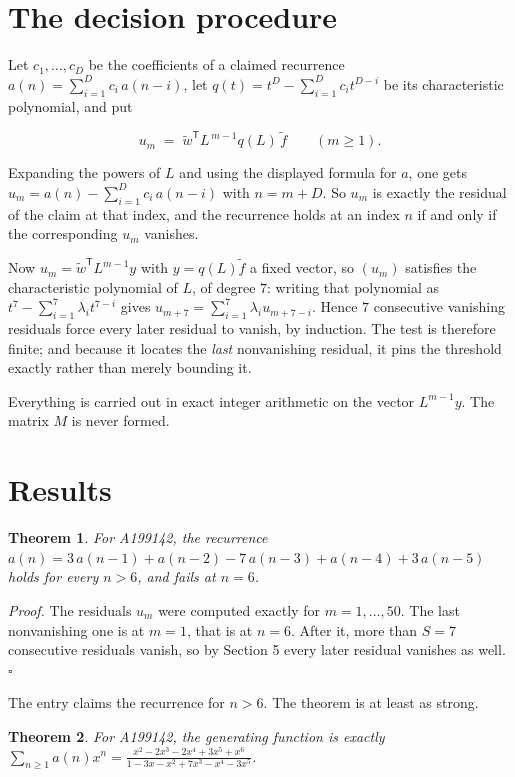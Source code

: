 \documentclass[11pt]{article}
\newtheorem{theorem}{Theorem}
\theoremstyle{definition}
\begin{document}
\section{The decision procedure}

Let $c_1,\dots,c_D$ be the coefficients of a claimed recurrence $a(n) = \sum_{i=1}^{D} c_i\,a(n-i)$, let $q(t) = t^{D} - \sum_{i=1}^{D} c_i t^{D-i}$ be its characteristic polynomial, and put

\[u_m \;=\; \tilde w^{\mathsf T} L^{\,m-1} q(L)\,\tilde f \qquad (m \ge 1).\]

Expanding the powers of $L$ and using the displayed formula for $a$, one gets $u_m = a(n) - \sum_{i=1}^{D} c_i\,a(n-i)$ with $n = m + D$. So $u_m$ is exactly the residual of the claim at that index, and the recurrence holds at an index $n$ if and only if the corresponding $u_m$ vanishes.

Now $u_m = \tilde w^{\mathsf T} L^{m-1} y$ with $y = q(L)\tilde f$ a fixed vector, so $(u_m)$ satisfies the characteristic polynomial of $L$, of degree $7$: writing that polynomial as $t^{7} - \sum_{i=1}^{7} \lambda_i t^{7-i}$ gives $u_{m+7} = \sum_{i=1}^{7} \lambda_i u_{m+7-i}$. Hence $7$ consecutive vanishing residuals force every later residual to vanish, by induction. The test is therefore finite; and because it locates the {\itshape last} nonvanishing residual, it pins the threshold exactly rather than merely bounding it.

Everything is carried out in exact integer arithmetic on the vector $L^{m-1}y$. The matrix $M$ is never formed.

\section{Results}

\begin{theorem} For A199142, the recurrence $a(n) = 3\,a(n-1) + a(n-2) - 7\,a(n-3) + a(n-4) + 3\,a(n-5)$ holds for every $n > 6$, and fails at $n = 6$.\end{theorem}

{\itshape Proof.} The residuals $u_m$ were computed exactly for $m = 1,\dots,50$. The last nonvanishing one is at $m = 1$, that is at $n = 6$. After it, more than $S = 7$ consecutive residuals vanish, so by Section 5 every later residual vanishes as well. $\square$

The entry claims the recurrence for $n > 6$. The theorem is at least as strong.

\begin{theorem} For A199142, the generating function is exactly $\sum_{n\ge 1} a(n)x^n = \frac{x^{2} - 2x^{3} - 2x^{4} + 3x^{5} + x^{6}}{1 - 3x - x^{2} + 7x^{3} - x^{4} - 3x^{5}}$.\end{theorem}
\end{document}
